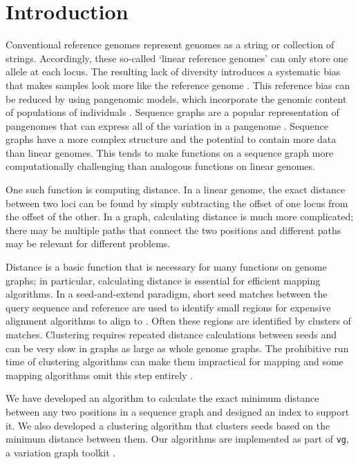\documentclass[11pt]{ucscthesis}
\begin{document}
\newpage

\section{Introduction}
Conventional reference genomes represent genomes as a string or collection of strings.
Accordingly, these so-called ‘linear reference genomes’ can only store one allele at each locus.
The resulting lack of diversity introduces a systematic bias that makes samples look more like the reference genome \cite{zook_integrating_2014}.
This reference bias can be reduced by using pangenomic models, which incorporate the genomic content of populations of individuals \cite{noauthor_computational_2016}.
Sequence graphs are a popular representation of pangenomes that can express all of the variation in a pangenome \cite{paten_genome_2017}. 
Sequence graphs have a more complex structure and the potential to contain more data than linear genomes.
This tends to make functions on a sequence graph more computationally challenging than analogous functions on linear genomes.

One such function is computing distance.
In a linear genome, the exact distance between two loci can be found by simply subtracting the offset of one locus from the offset of the other.
In a graph, calculating distance is much more complicated; there may be multiple paths that connect the two positions and different paths may be relevant for different problems.

Distance is a basic function that is necessary for many functions on genome graphs; in particular, calculating distance is essential for efficient mapping algorithms.
In a seed-and-extend paradigm, short seed matches between the query sequence and reference are used to identify small regions for expensive alignment algorithms to align to \cite{schneeberger_simultaneous_2009,li_minimap_2016,rakocevic_fast_2019,garrison_vg_2018,vaddadi_read_2019,rautiainen_bit-parallel_2019}. 
Often these regions are identified by clusters of matches. 
Clustering requires repeated distance calculations between seeds and can be very slow in graphs as large as whole genome graphs. 
The prohibitive run time of clustering algorithms can make them impractical for mapping and some mapping algorithms omit this step entirely \cite{rautiainen_bit-parallel_2019}.

We have developed an algorithm to calculate the exact minimum distance between any two positions in a sequence graph and designed an index to support it. We also developed a clustering algorithm that clusters seeds based on the minimum distance between them. Our algorithms are implemented as part of \texttt{vg}, a variation graph toolkit \cite{garrison_vg_2018}.
\end{document}
